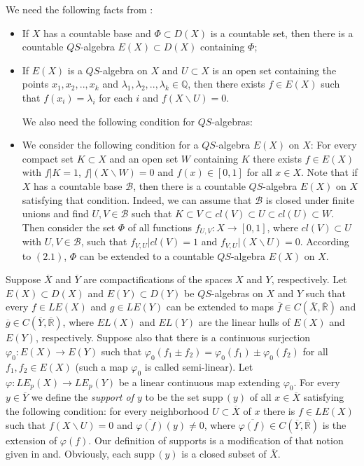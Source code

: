 \documentclass[12pt]{amsart}
\def\supp{{\mathrm {supp}}\,}
\begin{document}
We need the following facts from \cite{gu}: 
\begin{itemize}
\item[(2.1)] If $X$ has a countable base and $\Phi\subset D(X)$ is a countable set, then there is a countable $QS$-algebra $E(X)\subset D(X)$ containing $\Phi$; 
\item[(2.2)] If $E(X)$ is a $QS$-algebra on $X$ and $U\subset X$ is an open set containing the points $x_1,x_2,..,x_k$ and $\lambda_1,\lambda_2,..,\lambda_k\in\mathbb Q$, then there exists $f\in E(X)$ such that $f(x_i)=\lambda_i$ for each $i$ and $f(X\backslash U)=0$.
     
 We also need the following condition for $QS$-algebras:     
\item[(2.3)] We consider the following condition for a $QS$-algebra $E(X)$ on $X$: For every compact set  $K\subset X$ and an open set $W$ containing $K$ there exists $f\in E(X)$ with $f|K=1$, $f|(X\backslash W)=0$ and $f(x)\in [0,1]$ for all $x\in X$. Note that 
if $X$ has a countable base $\mathcal B$, then there is a countable $QS$-algebra $E(X)$ on $X$ satisfying that condition. Indeed, we can assume that $\mathcal B$ is closed under finite unions and find $U,V\in\mathcal B$ such that $K\subset V\subset cl(V)\subset U\subset cl(U)\subset W$. Then consider the set $\Phi$ of all functions $f_{U,V}:X\to [0,1]$, where $cl(V)\subset U$ with $U,V\in\mathcal B$, such that  
    $f_{V,U}|cl(V)=1$ and $f_{V,U}|(X\backslash U)=0$. According to $(2.1)$, $\Phi$ can be extended to a countable $QS$-algebra $E(X)$ on $X$. 
\end{itemize}
Suppose $\overline X$ and $\overline Y$ are compactifications of the spaces $X$ and $Y$, respectively. Let $E(X)\subset D(X)$ and $E(Y)\subset D(Y)$ be $QS$-algebras on $X$ and $Y$ such that every $f\in LE(X)$ and $g\in LE(Y)$ can be extended to maps $\overline f\in C(\overline X,\overline{\mathbb R})$ and $\overline g\in C(\overline Y,\overline{\mathbb R})$, where $EL(X)$ and $EL(Y)$ are the linear hulls of $E(X)$ and $E(Y)$, respectively. Suppose also that there is a continuous surjection 
$\varphi_0:E(X)\to E(Y)$ such that $\varphi_0(f_1\pm f_2)=\varphi_0(f_1)\pm\varphi_0(f_2)$ for all $f_1,f_2\in E(X)$ (such a map $\varphi_0$ is called semi-linear). Let $\varphi:LE_p(X)\to LE_p(Y)$ be a linear continuous map extending $\varphi_0$.
For every $y\in\overline Y$ we define the {\em support of $y$} to be the set $\supp(y)$ of all $x\in\overline X$ satisfying the following condition: for every neighborhood $U\subset\overline X$ of $x$ there is $f\in LE(X)$ such that $f(X\backslash U)=0$ and $\overline{\varphi(f)}(y)\neq 0$, where  
$\overline{\varphi(f)}\in C(\overline Y,\overline{\mathbb R})$ is the extension of $\varphi(f)$. Our definition of supports is a modification of that notion given in \cite{ar1} and\cite{vv}.
Obviously, each $\supp(y)$ is a closed subset of $\overline X$.
\end{document}
